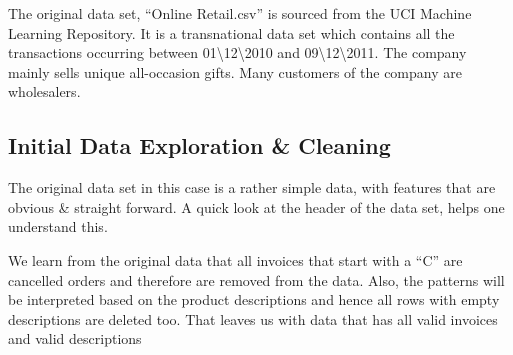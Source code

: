 \documentclass[
]{article}
\begin{document}
The original data set, ``Online Retail.csv'' is sourced from the UCI
Machine Learning Repository. It is a transnational data set which
contains all the transactions occurring between
01\textbackslash12\textbackslash2010 and
09\textbackslash12\textbackslash2011. The company mainly sells unique
all-occasion gifts. Many customers of the company are wholesalers.

\hypertarget{initial-data-exploration-cleaning}{%
\subsection{Initial Data Exploration \&
Cleaning}\label{initial-data-exploration-cleaning}}

The original data set in this case is a rather simple data, with
features that are obvious \& straight forward. A quick look at the
header of the data set, helps one understand this.


\newpage

We learn from the original data that all invoices that start with a
``C'' are cancelled orders and therefore are removed from the data.
Also, the patterns will be interpreted based on the product descriptions
and hence all rows with empty descriptions are deleted too. That leaves
us with data that has all valid invoices and valid descriptions
\end{document}
